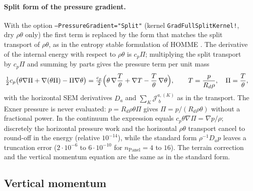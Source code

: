 \documentclass[11pt,a4paper]{article}
\newcommand{\Jm}{\mathcal{J}}
\newcommand{\code}[1]{\texttt{#1}}
\begin{document}
\paragraph{Split form of the pressure gradient.}
With the option \code{--PressureGradient="Split"}
(kernel \code{GradFullSplitKernel!}, dry $\rho\theta$ only) the first term is replaced by the form that matches the
split transport of $\rho\theta$, as in the entropy stable formulation of
HOMME \cite{TaylorSplit2025}. The derivative of the internal energy with
respect to $\rho\theta$ is $c_p\Pi$; multiplying the split transport by
$c_p\Pi$ and summing by parts gives the pressure term per unit mass
\begin{equation}
  \tfrac12 c_p\bigl(\theta\nabla\Pi + \nabla(\theta\Pi) - \Pi\nabla\theta\bigr)
  = \tfrac{c_p}2\Bigl(\theta\,\nabla\frac T\theta + \nabla T
    - \frac T\theta\,\nabla\theta\Bigr),\qquad
  T = \frac{p}{R_d\rho},\quad \Pi = \frac T\theta ,
\end{equation}
with the horizontal SEM derivatives $D_a$ and $\sum_K\Jm^{a,(K)}_{\;b}$ as
in the transport. The Exner pressure is never evaluated: $p = R_d\rho\theta\Pi$
gives $\Pi = p/(R_d\rho\theta)$ without a fractional power. In the continuum
the expression equals $c_p\theta\nabla\Pi = \nabla p/\rho$; discretely the
horizontal pressure work and the horizontal $\rho\theta$ transport cancel to
round-off in the energy (relative $10^{-14}$), while the standard form
$\rho^{-1}D_ap$ leaves a truncation error ($2\cdot10^{-6}$ to $6\cdot10^{-10}$
for $n_{\text{Panel}} = 4$ to $16$). The terrain correction and the vertical
momentum equation are the same as in the standard form.

\subsection{Vertical momentum}
\label{sec:w}
\end{document}
